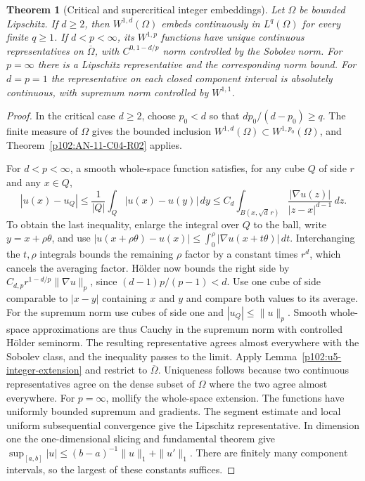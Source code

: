 \documentclass[11pt,oneside,openany]{book}
\newtheorem{theorem}{Theorem}[chapter]
\theoremstyle{definition}
\theoremstyle{remark}
\begin{document}
\begin{theorem}[Critical and supercritical integer embeddings]
\label{p102:AN-11-C04-R04}
Let \(\Omega\) be bounded Lipschitz. If \(d\ge2\), then
\(W^{1,d}(\Omega)\) embeds continuously in \(L^q(\Omega)\) for every
finite \(q\ge1\). If \(d<p<\infty\), its \(W^{1,p}\) functions have
unique continuous representatives on \(\overline\Omega\), with
\(C^{0,1-d/p}\) norm controlled by the Sobolev norm. For \(p=\infty\)
there is a Lipschitz representative and the corresponding norm bound.
For \(d=p=1\) the representative on each closed component interval
is absolutely continuous, with supremum norm controlled by
\(W^{1,1}\).
\end{theorem}
\begin{proof}
In the critical case \(d\ge2\), choose \(p_0<d\) so that
\(dp_0/(d-p_0)\ge q\). The finite measure of \(\Omega\) gives the
bounded inclusion \(W^{1,d}(\Omega)\subset W^{1,p_0}(\Omega)\), and
Theorem~\ref{p102:AN-11-C04-R02} applies.

For \(d<p<\infty\), a smooth whole-space function satisfies, for any
cube \(Q\) of side \(r\) and any \(x\in Q\),
\[
 |u(x)-u_Q|
 \le \frac1{|Q|}\int_Q|u(x)-u(y)|\,dy
 \le C_d\int_{B(x,\sqrt d\,r)}
              \frac{|\nabla u(z)|}{|z-x|^{d-1}}\,dz .
\]
To obtain the last inequality, enlarge the integral over \(Q\) to
the ball, write \(y=x+\rho\theta\), and use
\(|u(x+\rho\theta)-u(x)|\le\int_0^\rho|\nabla u(x+t\theta)|\,dt\).
Interchanging the \(t,\rho\) integrals bounds the remaining \(\rho\)
factor by a constant times \(r^d\), which cancels the averaging factor.
H\"older now bounds the right side by
\(C_{d,p} r^{1-d/p}\|\nabla u\|_p\), since
\((d-1)p/(p-1)<d\). Use one cube of side comparable to \(|x-y|\)
containing \(x\) and \(y\) and compare both values to its average.
For the supremum norm use cubes of side one and
\(|u_Q|\le \|u\|_p\). Smooth whole-space approximations are thus
Cauchy in the supremum norm with controlled H\"older seminorm.
The resulting representative agrees almost everywhere with the
Sobolev class, and the inequality passes to the limit. Apply
Lemma~\ref{p102:u5-integer-extension} and restrict to \(\overline
\Omega\). Uniqueness follows because two continuous representatives
agree on the dense subset of \(\Omega\) where the two agree
almost everywhere. For \(p=\infty\), mollify the whole-space extension.
The functions have uniformly bounded supremum and gradients. The
segment estimate and local uniform subsequential convergence give the
Lipschitz representative. In dimension one the one-dimensional
slicing and fundamental theorem give
\(\sup_{[a,b]}|u|\le (b-a)^{-1}\|u\|_1+\|u'\|_1\). There are
finitely many component intervals, so the largest of these constants
suffices.
\end{proof}
\end{document}
